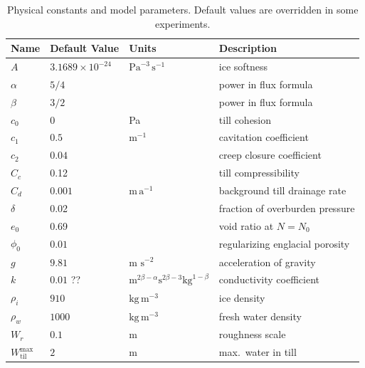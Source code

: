 \documentclass[gmd]{copernicus}   %
\newcommand{\text}{\textrm}
\newcommand{\Wtilmax}{W_{\text{til}}^{\text{max}}}
\begin{document}
\begin{table}[ht]
  \centering
  \caption{Physical constants and model parameters.  Default values are overridden in some experiments.}
  \begin{tabular}{lllp{3.0in}} 
    \textbf{Name} & \textbf{Default Value} & \textbf{Units} & \textbf{Description}\\
\hline
    $A$ & $3.1689\times 10^{-24}$ & $\text{Pa}^{-3}\,\text{s}^{-1}$ & ice softness \citep{EISMINT96} \phantom{$\Big|$} \\
    $\alpha$ & $5/4$ & & power in flux formula  \citep{Schoofetal2012} \\
    $\beta$ & $3/2$ & & power in flux formula  \citep{Schoofetal2012} \\
    $c_0$ & 0 & Pa & till cohesion \citep{Tulaczyketal2000} \\
    $c_1$ & $0.5$ & $\text{m}^{-1}$ & cavitation coefficient \citep{Schoofetal2012} \\
    $c_2$ & $0.04$ & & creep closure coefficient \\
    $C_c$ & 0.12 &  & till compressibility \citep{Tulaczyketal2000} \\
    $C_d$ & $0.001$ &  $\text{m}\,\text{a}^{-1}$ & background till drainage rate \\
    $\delta$ & 0.02 &  & fraction of overburden pressure \\
    $e_0$ & 0.69 &  & void ratio at $N=N_0$ \citep{Tulaczyketal2000} \\
    $\phi_0$ & $0.01$ & & regularizing englacial porosity \\
    $g$ & $9.81$ & m $\text{s}^{-2}$ & acceleration of gravity \\
    $k$ & $0.01$ ?? & $\text{m}^{2\beta-\alpha} \text{s}^{2\beta-3} \text{kg}^{1-\beta}$ & conductivity coefficient \citep{Schoofetal2012} \\
    $\rho_i$ & $910$ & $\text{kg}\,\text{m}^{-3}$ & ice density \citep{GreveBlatter2009} \\
    $\rho_w$ & $1000$ & $\text{kg}\,\text{m}^{-3}$ & fresh water density \citep{GreveBlatter2009} \\
    $W_r$ & $0.1$ & $\text{m}$ & roughness scale \citep{Hewittetal2012} \\
    $\Wtilmax$ & $2\phantom{\Big|}$ & $\text{m}$ & max.~water in till \citep{BBssasliding} \\
    \hline
  \end{tabular}
 \label{tab:constants}
\end{table}
\end{document}

